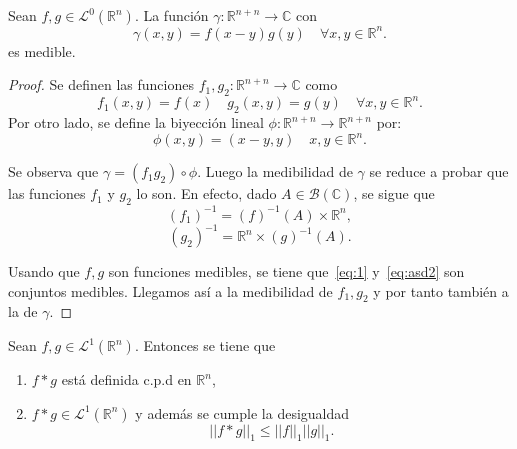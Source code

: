 \begin{lema}\label{lema_gamma}
   Sean $f,g \in \mathscr{L}^0(\mathbb{R}^n)$. La función $\gamma : \mathbb{R}^{n+n} \rightarrow \mathbb{C}$ con
    \begin{equation}
        \gamma(x,y) = f(x-y)g(y) \quad \forall x,y \in \mathbb{R}^n.
    \end{equation}
    es medible.
\end{lema}
\begin{proof}
\noindent Se definen las funciones $f_1,g_2: \mathbb{R}^{n+n} \rightarrow \mathbb{C}$ como
\begin{equation}
    f_1(x,y) =f(x) \quad g_2(x,y) =g(y) \quad \forall x,y \in \mathbb{R}^n.
\end{equation}
Por otro lado, se define la biyección lineal $\phi : \mathbb{R}^{n+n} \rightarrow \mathbb{R}^{n+n}$ por:
\begin{equation}
    \phi(x,y) = (x-y,y) \quad x,y \in \mathbb{R}^n.
\end{equation}

\noindent Se observa que $\gamma = (f_1g_2) \circ\phi$. Luego la medibilidad de $\gamma$ se reduce a probar que las funciones $f_1$ y $g_2$ lo son.
En efecto, dado $A \in \mathcal{B}(\mathbb{C})$, se sigue que
\begin{equation}\label{eq:1}
    (f_1)^{-1} = (f)^{-1}(A) \times \mathbb{R}^n,
\end{equation}
\begin{equation}\label{eq:asd2}
    (g_2)^{-1} =  \mathbb{R}^n \times (g)^{-1}(A).
\end{equation}

\noindent Usando que $f,g$ son funciones medibles, se tiene que~\eqref{eq:1} y~\eqref{eq:asd2} son conjuntos medibles. Llegamos así a la medibilidad de $f_1,g_2$ y por tanto también a la de $\gamma$.
\end{proof}

\begin{teorema}\label{teo:conv}
Sean $f,g \in \mathscr{L}^1(\mathbb{R}^n)$. Entonces se tiene que 
\begin{enumerate}
    \item $f*g$ está definida c.p.d en $\mathbb{R}^n$,
    \item $f*g \in \mathscr{L}^1(\mathbb{R}^n)$ y además se cumple la desigualdad
    \begin{equation}
        ||f*g||_1 \leq ||f||_1 ||g||_1.
    \end{equation}  
\end{enumerate}
\end{teorema}

